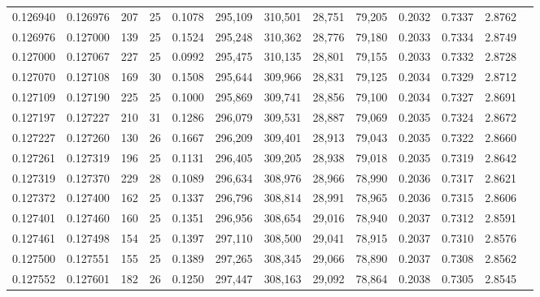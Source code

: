 \begin{tabular}{rrrrrrrrrrrrr}
0.126940 & 0.126976 & 207 &  25 &                                     0.1078 & 295,109 & 310,501 &  28,751 &  79,205 & 0.2032 & 0.7337 & 2.8762 \\
0.126976 & 0.127000 & 139 &  25 &                                     0.1524 & 295,248 & 310,362 &  28,776 &  79,180 & 0.2033 & 0.7334 & 2.8749 \\
0.127000 & 0.127067 & 227 &  25 &                                     0.0992 & 295,475 & 310,135 &  28,801 &  79,155 & 0.2033 & 0.7332 & 2.8728 \\
0.127070 & 0.127108 & 169 &  30 &                                     0.1508 & 295,644 & 309,966 &  28,831 &  79,125 & 0.2034 & 0.7329 & 2.8712 \\
0.127109 & 0.127190 & 225 &  25 &                                     0.1000 & 295,869 & 309,741 &  28,856 &  79,100 & 0.2034 & 0.7327 & 2.8691 \\
0.127197 & 0.127227 & 210 &  31 &                                     0.1286 & 296,079 & 309,531 &  28,887 &  79,069 & 0.2035 & 0.7324 & 2.8672 \\
0.127227 & 0.127260 & 130 &  26 &                                     0.1667 & 296,209 & 309,401 &  28,913 &  79,043 & 0.2035 & 0.7322 & 2.8660 \\
0.127261 & 0.127319 & 196 &  25 &                                     0.1131 & 296,405 & 309,205 &  28,938 &  79,018 & 0.2035 & 0.7319 & 2.8642 \\
0.127319 & 0.127370 & 229 &  28 &                                     0.1089 & 296,634 & 308,976 &  28,966 &  78,990 & 0.2036 & 0.7317 & 2.8621 \\
0.127372 & 0.127400 & 162 &  25 &                                     0.1337 & 296,796 & 308,814 &  28,991 &  78,965 & 0.2036 & 0.7315 & 2.8606 \\
0.127401 & 0.127460 & 160 &  25 &                                     0.1351 & 296,956 & 308,654 &  29,016 &  78,940 & 0.2037 & 0.7312 & 2.8591 \\
0.127461 & 0.127498 & 154 &  25 &                                     0.1397 & 297,110 & 308,500 &  29,041 &  78,915 & 0.2037 & 0.7310 & 2.8576 \\
0.127500 & 0.127551 & 155 &  25 &                                     0.1389 & 297,265 & 308,345 &  29,066 &  78,890 & 0.2037 & 0.7308 & 2.8562 \\
0.127552 & 0.127601 & 182 &  26 &                                     0.1250 & 297,447 & 308,163 &  29,092 &  78,864 & 0.2038 & 0.7305 & 2.8545 \\

\end{tabular}
